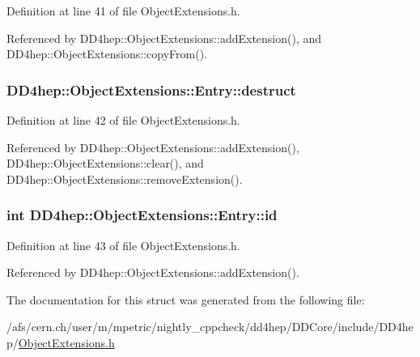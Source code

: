Definition at line 41 of file ObjectExtensions.h.

Referenced by DD4hep::ObjectExtensions::addExtension(), and DD4hep::ObjectExtensions::copyFrom().\hypertarget{struct_d_d4hep_1_1_object_extensions_1_1_entry_a4a7454a4a71075f91c6c260025eaf89c}{
\subsubsection[{destruct}]{ {\bf DD4hep::ObjectExtensions::Entry::destruct}}}
\label{struct_d_d4hep_1_1_object_extensions_1_1_entry_a4a7454a4a71075f91c6c260025eaf89c}


Definition at line 42 of file ObjectExtensions.h.

Referenced by DD4hep::ObjectExtensions::addExtension(), DD4hep::ObjectExtensions::clear(), and DD4hep::ObjectExtensions::removeExtension().\hypertarget{struct_d_d4hep_1_1_object_extensions_1_1_entry_a96f2362da856b43495f39a9d0ef48c0f}{
\subsubsection[{id}]{\setlength{\rightskip}{0pt plus 5cm}int {\bf DD4hep::ObjectExtensions::Entry::id}}}
\label{struct_d_d4hep_1_1_object_extensions_1_1_entry_a96f2362da856b43495f39a9d0ef48c0f}


Definition at line 43 of file ObjectExtensions.h.

Referenced by DD4hep::ObjectExtensions::addExtension().

The documentation for this struct was generated from the following file:\begin{DoxyCompactItemize}
\item 
/afs/cern.ch/user/m/mpetric/nightly\_\-cppcheck/dd4hep/DDCore/include/DD4hep/\hyperlink{_object_extensions_8h}{ObjectExtensions.h}\end{DoxyCompactItemize}
